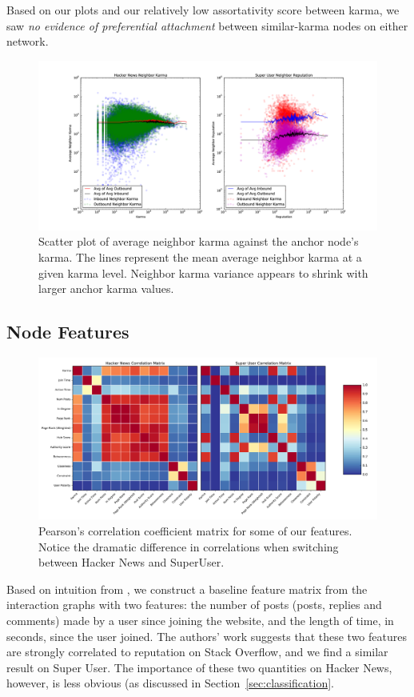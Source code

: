 \documentclass[11pt]{article}
\begin{document}
Based on our plots and our relatively low assortativity score between karma, we
saw \textit{no evidence of preferential attachment} between similar-karma nodes
on either network.

\begin{figure}[t]
\centering
\includegraphics[width=\linewidth]{karma_cliques-png}
\caption{Scatter plot of average neighbor karma against the anchor node's karma. 
The lines represent the mean average neighbor karma at a given karma level.
Neighbor karma variance appears to shrink with larger anchor karma values.}
\label{fig:karma_cliques}
\end{figure}


\subsection{Node Features}
\begin{figure}[t]
\centering

\includegraphics[width=\linewidth]{correlation-png}
\caption{Pearson's correlation coefficient matrix for some of our features.
Notice the dramatic difference in correlations when switching between 
Hacker News and SuperUser.}
\label{fig:correlation}
\end{figure}
Based on intuition from \citet{movshovitzanalysis}, we construct a baseline
feature matrix from the interaction graphs with two features: the number of
posts (posts, replies and comments) made by a user since joining the website,
and the length of time, in seconds, since the user joined. The authors' work
suggests that these two features are strongly correlated to reputation on Stack
Overflow, and we find a similar result on Super User. The importance of these
two quantities on Hacker News, however, is less obvious (as discussed in
Section~\ref{sec:classification}.
\end{document}

